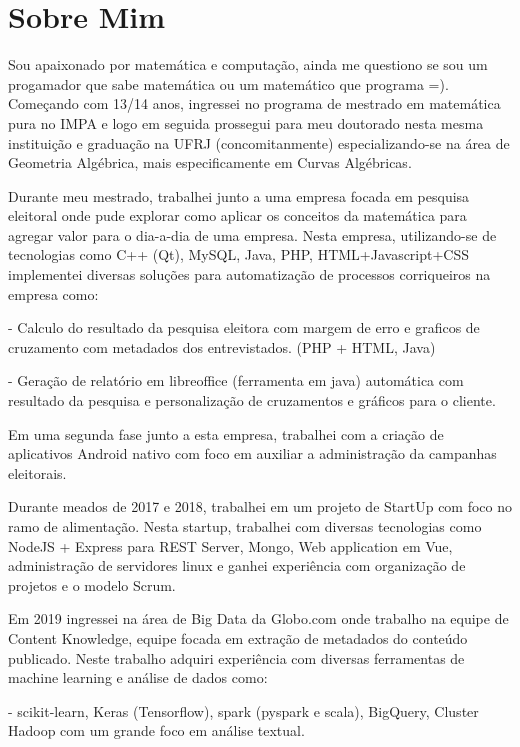 \documentclass[a4paper, oneside, final]{scrartcl} %
\begin{document}
\section{Sobre Mim}
Sou apaixonado por matemática e computação, ainda me questiono se sou um progamador que sabe matemática ou um matemático que programa =).
Começando com 13/14 anos, ingressei no programa de mestrado em matemática pura no IMPA e logo em seguida prossegui para meu doutorado nesta mesma instituição e graduação na UFRJ (concomitanmente) especializando-se na área de Geometria Algébrica, mais especificamente em Curvas Algébricas.

Durante meu mestrado, trabalhei junto a uma empresa focada em pesquisa eleitoral onde pude explorar como aplicar os conceitos da matemática para agregar valor para o dia-a-dia de uma empresa. Nesta empresa, utilizando-se de
tecnologias como C++ (Qt), MySQL, Java, PHP, HTML+Javascript+CSS implementei diversas soluções para automatização de processos corriqueiros na empresa como:

- Calculo do resultado da pesquisa eleitora com margem de erro e graficos de cruzamento com metadados dos entrevistados. (PHP + HTML, Java)

- Geração de relatório em libreoffice (ferramenta em java) automática com resultado da pesquisa e personalização de cruzamentos e gráficos para o cliente.

Em uma segunda fase junto a esta empresa, trabalhei com a criação de aplicativos Android nativo com foco em auxiliar a administração da campanhas eleitorais.

Durante meados de 2017 e 2018, trabalhei em um projeto de StartUp com foco no ramo de alimentação. Nesta startup, trabalhei com diversas tecnologias como NodeJS + Express para REST Server, Mongo, Web application em Vue, administração de servidores linux e ganhei experiência com organização de projetos e o modelo Scrum.

Em 2019 ingressei na área de Big Data da Globo.com onde trabalho na equipe de Content Knowledge, equipe focada em extração de metadados do conteúdo publicado. Neste trabalho adquiri experiência com diversas ferramentas de machine learning e análise de dados como:

- scikit-learn, Keras (Tensorflow), spark (pyspark e scala), BigQuery, Cluster Hadoop
com um grande foco em análise textual.
\end{document}
